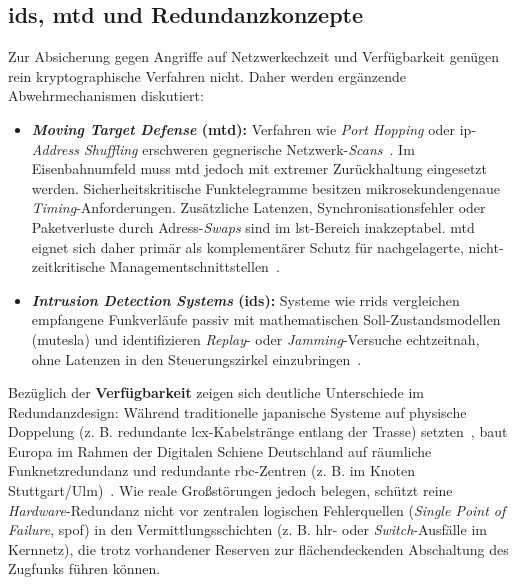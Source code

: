 \documentclass[runningheads]{res/llncs}
\begin{document}
\subsection{\texorpdfstring{\gls{ids}, \gls{mtd} und Redundanzkonzepte}{IDS, MTD und Redundanzkonzepte}}
\label{sec:IDS_MTD_und_Redundanzkonzepte}
Zur Absicherung gegen Angriffe auf Netzwerkechzeit und Verfügbarkeit genügen rein kryptographische Verfahren nicht. Daher werden ergänzende Abwehrmechanismen diskutiert:

\begin{itemize}
    \item \textbf{\textit{Moving Target Defense} (\gls{mtd}):} Verfahren wie \textit{Port Hopping} oder \gls{ip}-\textit{Address Shuffling} erschweren gegnerische Netzwerk-\textit{Scans}~\parencite[S. 121]{poschingerOpenMTD2020}. Im Eisenbahnumfeld muss \gls{mtd} jedoch mit extremer Zurückhaltung eingesetzt werden. Sicherheitskritische Funktelegramme besitzen mikrosekundengenaue \textit{Timing}-Anforderungen. Zusätzliche Latenzen, Synchronisationsfehler oder Paketverluste durch Adress-\textit{Swaps} sind im \gls{lst}-Bereich inakzeptabel. \gls{mtd} eignet sich daher primär als komplementärer Schutz für nachgelagerte, nicht-zeitkritische Managementschnittstellen~\parencite[S. 121]{poschingerOpenMTD2020}.
    \item \textbf{\textit{Intrusion Detection Systems} (\gls{ids}):} Systeme wie \gls{rrids} vergleichen empfangene Funkverläufe passiv mit mathematischen Soll-Zustandsmodellen (\gls{mutesla}) und identifizieren \textit{Replay}- oder \textit{Jamming}-Versuche echtzeitnah, ohne Latenzen in den Steuerungszirkel einzubringen~\parencite[S. 60--63]{melaragnoRail2016}.
\end{itemize}

Bezüglich der \textbf{Verfügbarkeit} zeigen sich deutliche Unterschiede im Redundanzdesign: Während traditionelle japanische Systeme auf physische Doppelung (z. B. redundante \gls{lcx}-Kabelstränge entlang der Trasse) setzten~\parencite[S. 14--15]{xiangliuCyber2020}, baut Europa im Rahmen der Digitalen Schiene Deutschland auf räumliche Funknetzredundanz und redundante \gls{rbc}-Zentren (z. B. im Knoten Stuttgart/Ulm)~\parencite[S. 89--90, 211]{trinckaufETCS2024}. Wie reale Großstörungen jedoch belegen, schützt reine \textit{Hardware}-Redundanz nicht vor zentralen logischen Fehlerquellen (\textit{Single Point of Failure}, \gls{spof}) in den Vermittlungsschichten (z. B. \gls{hlr}- oder \textit{Switch}-Ausfälle im Kernnetz), die trotz vorhandener Reserven zur flächendeckenden Abschaltung des Zugfunks führen können.
\end{document}
